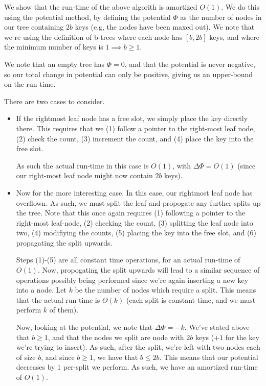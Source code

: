 \documentclass[12pt]{exam}
\newcommand*{\bigo}[1]{O \left( #1 \right)}
\begin{document}
\begin{questions}
\begin{solution}
We show that the run-time of the above algorith is amortized $\bigo{1}$. We do this using the potential method, by defining the potential $\Phi$ as the number of nodes in our tree containing $2b$ keys (e.g, the nodes have been maxed out). We note that we-re using the definition of b-trees where each node has $[b, 2b]$ keys, and where the minimum number of keys is $1 \implies b \geq 1$. 

We note that an empty tree has $\Phi = 0$, and that the potential is never negative, so our total change in potential can only be positive, giving us an upper-bound on the run-time.

There are two cases to consider.

\begin{itemize}
  \item If the rightmost leaf node has a free slot, we simply place the key directly there. This requires that we (1) follow a pointer to the right-most leaf node, (2) check the count, (3) increment the count, and (4) place the key into the free slot.

  As such the actual run-time in this case is $\bigo{1}$, with $\Delta \Phi = \bigo{1}$ (since our right-most leaf node might now contain $2b$ keys).

  \item Now for the more interesting case. In this case, our rightmost leaf node has overflown. As such, we must split the leaf and propogate any further splits up the tree. Note that this once again requires (1) following a pointer to the right-most leaf-node, (2) checking the count, (3) splitting the leaf node into two, (4) modifiying the counts, (5) placing the key into the free slot, and (6) propagating the split upwards.

  Steps (1)-(5) are all constant time operations, for an actual run-time of $\bigo{1}$. Now, propogating the split upwards will lead to a similar sequence of operations possibly being performed since we're again inserting a new key into a node. Let $k$ be the number of nodes which require a split. This means that the actual run-time is $\Theta(k)$ (each split is constant-time, and we must perform $k$ of them).

  Now, looking at the potential, we note that $\Delta \Phi = -k$. We've stated above that $b \geq 1$, and that the nodes we split are node with $2b$ keys ($+1$ for the key we're trying to insert). As such, after the split, we're left with two nodes each of size $b$, and since $b \geq 1$, we have that $b \leq 2b$. This means that our potential decreases by $1$ per-split we perform. As such, we have an amortized run-time of $\bigo{1}$.
\end{itemize}


\end{solution}
\end{questions}
\end{document}
